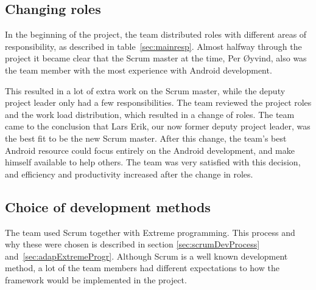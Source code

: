 \subsection{Changing roles}
\label{sec:unbalancedWorkload}
In the beginning of the project, the team distributed roles with different areas of responsibility, as described in table~\ref{sec:mainresp}. Almost halfway through the project it became clear that the Scrum master at the time, Per Øyvind, also was the team member with the most experience with Android development. 

This resulted in a lot of extra work on the Scrum master, while the deputy project leader only had a few responsibilities. The team reviewed the project roles and the work load distribution, which resulted in a change of roles. The team came to the conclusion that Lars Erik, our now former deputy project leader, was the best fit to be the new Scrum master. After this change, the team's best Android resource could focus entirely on the Android development, and make himself available to help others. The team was very satisfied with this decision, and efficiency and productivity increased after the change in roles.


\subsection{Choice of development methods}

The team used Scrum together with Extreme programming. This process and why these were chosen is described in section \ref{sec:scrumDevProcess} and~\ref{sec:adapExtremeProgr}. Although Scrum is a well known development method, a lot of the team members had different expectations to how the framework would be implemented in the project.

